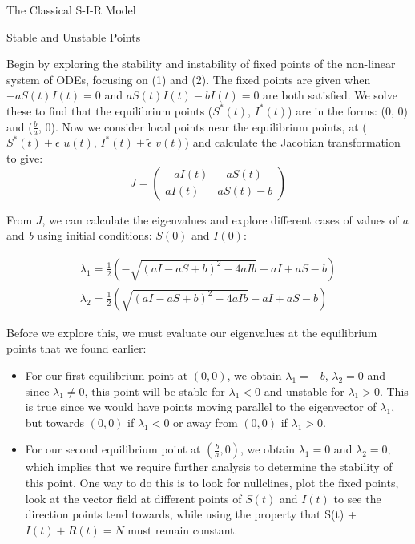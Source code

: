 \documentclass[final]{beamer}
\newlength{\colwidth}
\begin{document}
\begin{frame}[t]
\begin{columns}[t]
\begin{column}{\colwidth}
\begin{block}{The Classical S-I-R Model}
  
  \end{block}

  \begin{block}{Stable and Unstable Points}

  Begin by exploring the stability and instability of fixed points of the non-linear system of ODEs, focusing on (1) and (2). The fixed points are given when $-aS(t)I(t) = 0$ and $aS(t)I(t) - bI(t) = 0$ are both satisfied. We solve these to find that the equilibrium points ($S^{*}(t)$, $I^{*}(t)$) are in the forms: ($0$, $0$) and ($\frac{b}{a}$, $0$). Now we consider local points near the equilibrium points, at ($S^{*}(t) + \epsilon \hspace{4pt}u(t)$, $I^{*}(t) + \tilde{\epsilon} \hspace{4pt}v(t)$) and calculate the Jacobian transformation to give: 
  \[J = \left( \begin{array}{cc}
  -aI(t) & -aS(t)\\
   aI(t) & aS(t) - b
  \end{array} \right)
  \]

From $J$, we can calculate the eigenvalues and explore different cases of values of \textit{a} and \textit{b} using initial conditions: $S(0)$ and $I(0)$:

\begin{gather}
\lambda_{1} = \frac{1}{2} \left(-\sqrt{({aI}-{aS}+b)^2-4 {aI} b}-{aI}+{aS}-b\right)\\
\lambda_{2} = \frac{1}{2} \left(\sqrt{({aI}-{aS}+b)^2-4 {aI} b}-{aI}+{aS}-b\right)
\end{gather}

Before we explore this, we must evaluate our eigenvalues at the equilibrium points that we found earlier:

\begin{itemize}
    \item For our first equilibrium point at $(0,0)$, we obtain $\lambda_{1} = -b$, $\lambda_{2} = 0$ and since $\lambda_{1} \neq{0}$, this point will be stable for $\lambda_{1} < 0$ and unstable for $\lambda_{1} > 0$. This is true since we would have points moving parallel to the eigenvector of $\lambda_{1}$, but towards $(0,0)$ if $\lambda_{1} < 0$ or away from $(0,0)$ if $\lambda_{1} > 0$.

    \item For our second equilibrium point at $(\frac{b}{a}, 0)$, we obtain $\lambda_{1} = 0$ and $\lambda_{2} = 0$, which implies that we require further analysis to determine the stability of this point. One way to do this is to look for nullclines, plot the fixed points, look at the vector field at different points of $S(t)$ and $I(t)$ to see the direction points tend towards, while using the property that S(t) + $I(t) + R(t) = N$ must remain constant.
\end{itemize}


\end{block}
\end{column}
\end{columns}
\end{frame}
\end{document}
